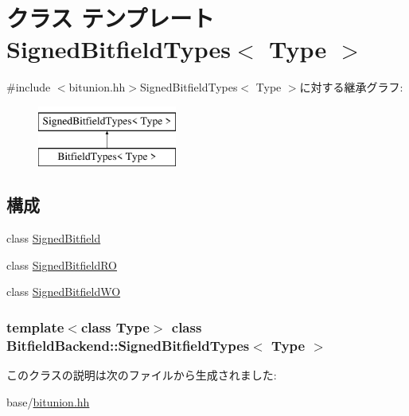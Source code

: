 \hypertarget{classBitfieldBackend_1_1SignedBitfieldTypes}{
\section{クラス テンプレート SignedBitfieldTypes$<$ Type $>$}
\label{classBitfieldBackend_1_1SignedBitfieldTypes}
}


{\ttfamily \#include $<$bitunion.hh$>$}SignedBitfieldTypes$<$ Type $>$に対する継承グラフ:\begin{figure}[H]
\begin{center}
\leavevmode
\includegraphics[height=2cm]{classBitfieldBackend_1_1SignedBitfieldTypes}
\end{center}
\end{figure}
\subsection*{構成}
\begin{DoxyCompactItemize}
\item 
class \hyperlink{classBitfieldBackend_1_1SignedBitfieldTypes_1_1SignedBitfield}{SignedBitfield}
\item 
class \hyperlink{classBitfieldBackend_1_1SignedBitfieldTypes_1_1SignedBitfieldRO}{SignedBitfieldRO}
\item 
class \hyperlink{classBitfieldBackend_1_1SignedBitfieldTypes_1_1SignedBitfieldWO}{SignedBitfieldWO}
\end{DoxyCompactItemize}
\subsubsection*{template$<$class Type$>$ class BitfieldBackend::SignedBitfieldTypes$<$ Type $>$}



このクラスの説明は次のファイルから生成されました:\begin{DoxyCompactItemize}
\item 
base/\hyperlink{bitunion_8hh}{bitunion.hh}\end{DoxyCompactItemize}
